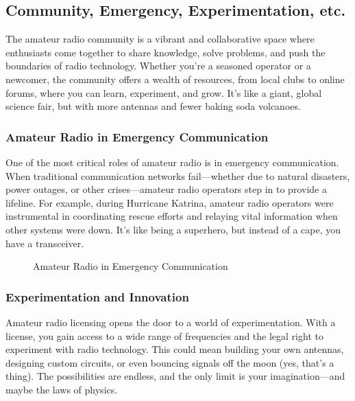 \subsection{Community, Emergency, Experimentation, etc.}
\label{subsec:why-ham}

The amateur radio community is a vibrant and collaborative space where enthusiasts come together to share knowledge, solve problems, and push the boundaries of radio technology. Whether you're a seasoned operator or a newcomer, the community offers a wealth of resources, from local clubs to online forums, where you can learn, experiment, and grow. It's like a giant, global science fair, but with more antennas and fewer baking soda volcanoes.

\subsubsection*{Amateur Radio in Emergency Communication}
One of the most critical roles of amateur radio is in emergency communication. When traditional communication networks fail—whether due to natural disasters, power outages, or other crises—amateur radio operators step in to provide a lifeline. For example, during Hurricane Katrina, amateur radio operators were instrumental in coordinating rescue efforts and relaying vital information when other systems were down. It's like being a superhero, but instead of a cape, you have a transceiver.

\begin{figure}[h]
    \centering
    \caption{Amateur Radio in Emergency Communication}
    \label{fig:emergency-communication}
\end{figure}

\subsubsection*{Experimentation and Innovation}
Amateur radio licensing opens the door to a world of experimentation. With a license, you gain access to a wide range of frequencies and the legal right to experiment with radio technology. This could mean building your own antennas, designing custom circuits, or even bouncing signals off the moon (yes, that's a thing). The possibilities are endless, and the only limit is your imagination—and maybe the laws of physics.

